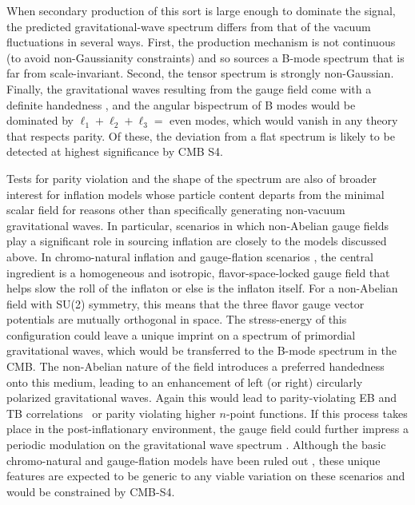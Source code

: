 When secondary production of this sort is large enough to dominate the signal, the predicted gravitational-wave spectrum differs from that of the vacuum fluctuations in several ways. First, the production mechanism is not continuous (to avoid non-Gaussianity constraints) and so sources a B-mode spectrum that is far from scale-invariant. Second, the tensor spectrum is strongly non-Gaussian. Finally, the gravitational waves resulting from the gauge field come with a definite handedness \cite{Anber:2006xt,Sorbo:2011rz}, and the angular bispectrum of B modes would be dominated by $\ell_1+\ell_2+\ell_3=$ even modes, which would vanish in any theory that respects parity. Of these, the deviation from a flat spectrum is likely to be detected at highest significance by CMB S4. 





Tests for parity violation and the shape of the spectrum are also of broader interest for inflation models whose particle content departs from the minimal scalar field for reasons other than specifically generating non-vacuum gravitational waves. In particular, scenarios in which non-Abelian gauge fields play a significant role in sourcing inflation are closely to the models discussed above. In chromo-natural inflation and gauge-flation scenarios \cite{Maleknejad:2011jw,Adshead:2012kp,Adshead:2012qe,Adshead:2013qp,Adshead:2013nka,Dimastrogiovanni:2012st,Dimastrogiovanni:2012ew}, the central ingredient is a homogeneous and isotropic, flavor-space-locked gauge field that helps slow the roll of the inflaton or else is the inflaton itself. For a non-Abelian field with SU(2) symmetry, this means that the three flavor gauge vector potentials are mutually orthogonal in space. The stress-energy of this configuration could leave a unique imprint on a spectrum of primordial gravitational waves, which would be transferred to the B-mode spectrum in the CMB. The non-Abelian nature of the field introduces a preferred handedness onto this medium, leading to an enhancement of left (or right) circularly polarized gravitational waves. Again this would lead to parity-violating EB and TB correlations~\cite{Lue:1998mq,Gluscevic:2010vv} or parity violating higher $n$-point functions. If this process takes place in the post-inflationary environment, the gauge field could further impress a periodic modulation on the gravitational wave spectrum \cite{Bielefeld:2014nza,Bielefeld:2015daa}. Although the basic chromo-natural and gauge-flation models have been ruled out \cite{Namba:2013kia}, these unique features are expected to be generic to any viable variation on these scenarios and would be constrained by CMB-S4.

